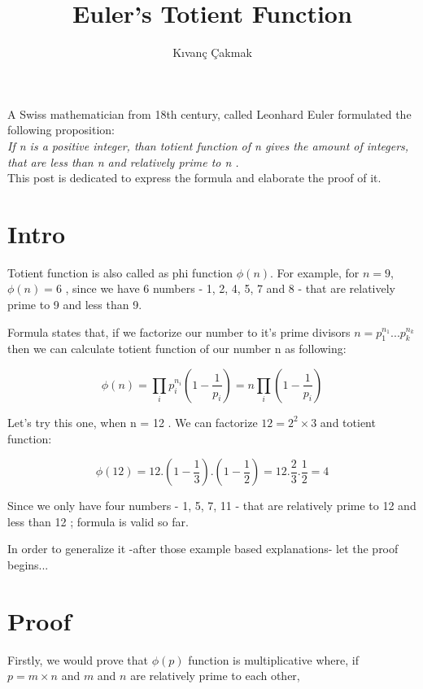 \documentclass[11pt]{article}
\title{\textbf{Euler's Totient Function}}
\author{K{\i}van\c{c} \c{C}akmak\\}
\date{}
\begin{document}
\maketitle

A Swiss mathematician from 18th century, called Leonhard Euler formulated the following proposition: \\

\textit{If n is a positive integer, than totient function of n gives the amount of integers, that are less than n and relatively prime to n .} \\

This post is dedicated to express the formula and elaborate the proof of it.

\section{Intro}

Totient function is also called as phi function $\phi(n)$. For example, for $n=9$, $\phi(n) = 6$ , since we have 6 numbers - 1, 2, 4, 5, 7 and 8 - that are relatively prime to 9 and less than 9.

 Formula states that, if we factorize our number to it's prime divisors $n = p_{1}^{n_1} ...p_{k}^{n_k}$ then we can calculate totient function of our number n as following: 

\begin{equation}
\phi(n) = \prod\limits_{i} p_{i}^{n_i} (1 - \frac{1}{p_{i}}) = n \prod\limits_{i}(1 - \frac{1}{p_i})
\end{equation}

Let's try this one, when n = 12 . We can factorize $12 = 2^2 \times 3$ and totient function: 

\begin{equation}
\phi(12) = 12 . (1 - \frac{1}{3}) . (1 - \frac{1}{2}) = 12 . \frac{2}{3} . \frac{1}{2} = 4 
\end{equation}

Since we only have four numbers - 1, 5, 7, 11 - that are relatively prime to 12 and less than 12 ; formula is valid so far.

In order to generalize it -after those example based explanations- let the proof begins...

\section{Proof}
Firstly, we would prove that $\phi(p)$ function is multiplicative where, if \\
$p = m \times n$ and $m$ and $n$ are relatively prime to each other,
\end{document}
